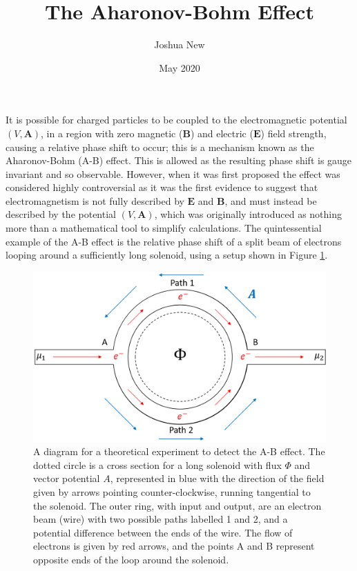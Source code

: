 \documentclass{article}
\title{The Aharonov-Bohm Effect}
\author{Joshua New}
\date{May 2020}
\begin{document}
\maketitle
It is possible for charged particles to be coupled to the electromagnetic potential $(V, \boldsymbol{A})$, in a region with zero magnetic ($\mathbf{B}$) and electric ($\mathbf{E}$) field strength, causing a relative phase shift to occur; this is a mechanism known as the Aharonov-Bohm (A-B) effect. This is allowed as the resulting phase shift is gauge invariant and so observable. However, when it was first proposed the effect was considered highly controversial as it was the first evidence to suggest that electromagnetism is not fully described by $\mathbf{E}$ and $\mathbf{B}$, and must instead be described by the potential $(V, \mathbf{A})$, which was originally introduced as nothing more than a mathematical tool to simplify calculations. The quintessential example of the A-B effect is the relative phase shift of a split beam of electrons looping around a sufficiently long solenoid, using a setup shown in Figure \ref{fig:solenoid}.

\begin{figure}[h]
    \centering
    \includegraphics[scale=0.5]{ABEffectSolenoid.png}
    \caption{A diagram for a theoretical experiment to detect the A-B effect. The dotted circle is a cross section for a long solenoid with flux $\Phi$ and vector potential $A$, represented in blue with the direction of the field given by arrows pointing counter-clockwise, running tangential to the solenoid. The outer ring, with input and output, are an electron beam (wire) with two possible paths labelled 1 and 2, and a potential difference between the ends of the wire. The flow of electrons is given by red arrows, and the points A and B represent opposite ends of the loop around the solenoid.}
    \label{fig:solenoid}
\end{figure}
\end{document}
